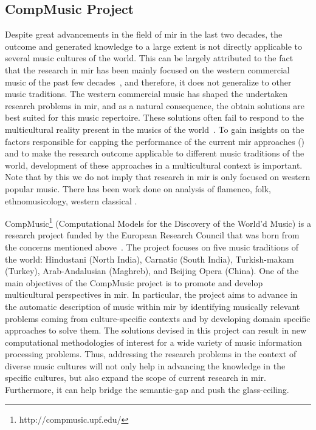 \subsection{CompMusic Project}
\label{sec:intro_motivation_compmusic}

Despite great advancements in the field of \gls{mir} in the last two decades, the outcome and generated knowledge to a large extent is not directly applicable to several music cultures of the world. This can be largely attributed to the fact that the research in \gls{mir} has been mainly focused on the western commercial music of the past few decades~\citep{XavierSerra2011}, and therefore, it does not generalize to other music traditions. The western commercial music has shaped the undertaken research problems in \gls{mir}, and as a natural consequence, the obtain solutions are best suited for this music repertoire. These solutions often fail to respond to the multicultural reality present in the musics of the world~\citep{XavierSerra2011}. To gain insights on the factors responsible for capping the performance of the current \gls{mir} approaches () and to make the research outcome applicable to different music traditions of the world, development of these approaches in a multicultural context is important. Note that by this we do not imply that research  in \gls{mir} is only focused on western popular music. There has been work done on analysis of flamenco, folk, ethnomusicology, western classical .

CompMusic\footnote{http://compmusic.upf.edu/} (Computational Models for the Discovery of the World'd Music) is a research project funded by the European Research Council that was born from the concerns mentioned above~\citep{XavierSerra2011}. The project focuses on five music traditions of the world: Hindustani (North India), Carnatic (South India), Turkish-makam (Turkey), Arab-Andalusian (Maghreb), and Beijing Opera (China). One of the main objectives of the CompMusic project is to promote and develop multicultural perspectives in \gls{mir}. In particular, the project aims to advance in the automatic description of music within \gls{mir} by identifying musically relevant problems coming from culture-specific contexts and by developing domain specific approaches to solve them. The solutions devised in this project can result in new computational methodologies of interest for a wide variety of music information processing problems. Thus, addressing the research problems in the context of diverse music cultures will not only help in advancing the knowledge in the specific cultures, but also expand the scope of current research in \gls{mir}. Furthermore, it can help bridge the semantic-gap and push the glass-ceiling.

